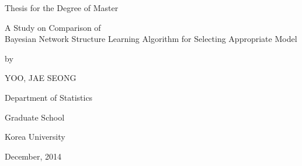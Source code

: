 \documentclass[12pt,a4paper,oneside]{book}
\theoremstyle{plain}
\theoremstyle{definition}
\theoremstyle{remark}
\theoremstyle{definition}
\numberwithin{equation}{chapter}
\begin{document}





 \linespread{1.0}
 \thispagestyle{empty}
 \begin{center}
 {\Large Thesis for the Degree of Master}
 \end{center}
 \vspace{20mm}
 \begin{center}
 \LARGE A Study on Comparison of\\ Bayesian Network Structure Learning Algorithm for Selecting Appropriate Model
 \end{center}
 \vspace{20mm} 
  \begin{center}
 {\Large by}
 \end{center}
 \begin{center}
 {\Large YOO, JAE SEONG}
 \end{center}
 \vspace{40mm}
 \begin{center}
 {\Large Department of Statistics}
 \end{center}
 \begin{center}
 {\Large Graduate School}
 \end{center}
 \begin{center}
 {\Large Korea University}
 \end{center}
  \vspace{5mm}
 \begin{center}
 {\Large December, 2014}
 \end{center}
 \linespread{1.6}
\end{document}
